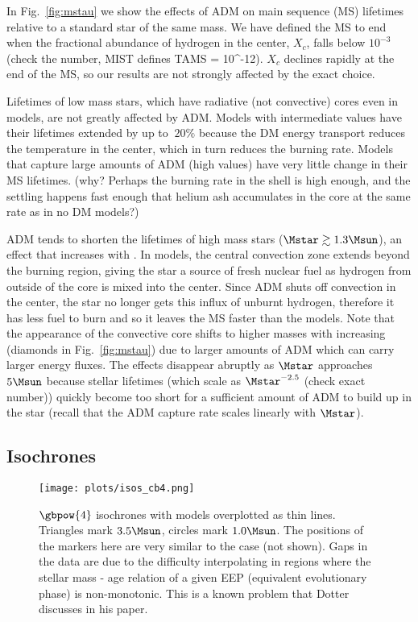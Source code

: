 In Fig.~\ref{fig:mstau} we show the effects of ADM on main sequence (MS) lifetimes relative to a standard \nodm star of the same mass. We have defined the MS to end when the fractional abundance of hydrogen in the center, $X_c$, falls below $10^{-3}$ (check the number, MIST defines TAMS = 10^-12). $X_c$ declines rapidly at the end of the MS, so our results are not strongly affected by the exact choice.

Lifetimes of low mass stars, which have radiative (not convective) cores even in \nodm models, are not greatly affected by ADM. Models with intermediate \gammaB values have their lifetimes extended by up to $~20\%$ because the DM energy transport reduces the temperature in the center, which in turn reduces the burning rate. Models that capture large amounts of ADM (high \gammaB values) have very little change in their MS lifetimes. (why? Perhaps the burning rate in the shell is high enough, and the settling happens fast enough that helium ash accumulates in the core at the same rate as in no DM models?)

ADM tends to shorten the lifetimes of high mass stars ($\Mstar \gtrsim 1.3 \Msun$), an effect that increases with \gammaB. In \nodm models, the central convection zone extends beyond the burning region, giving the star a source of fresh nuclear fuel as hydrogen from outside of the core is mixed into the center. Since ADM shuts off convection in the center, the star no longer gets this influx of unburnt hydrogen, therefore it has less fuel to burn and so it leaves the MS faster than the \nodm models. Note that the appearance of the convective core shifts to higher masses with increasing \gammaB (diamonds in Fig.~\ref{fig:mstau}) due to larger amounts of ADM which can carry larger energy fluxes. The effects disappear abruptly as $\Mstar$ approaches $5 \Msun$ because stellar lifetimes (which scale as $\Mstar^{-2.5}$ (check exact number)) quickly become too short for a sufficient amount of ADM to build up in the star (recall that the ADM capture rate scales linearly with $\Mstar$).


\subsection{Isochrones}
\label{sub:isochrones}

\begin{figure*}
  \centering
  \texttt{[image: plots/isos\_cb4.png]}
  \caption{$\gbpow{4}$ isochrones with \nodm models overplotted as thin lines. Triangles mark $3.5 \Msun$, circles mark $1.0 \Msun$. The positions of the markers here are very similar to the \nodm case (not shown). Gaps in the data are due to the difficulty interpolating in regions where the stellar mass - age relation of a given EEP (equivalent evolutionary phase) is non-monotonic. This is a known problem that Dotter discusses in his paper.
  }
  \label{fig:isos_cb4}
\end{figure*}

